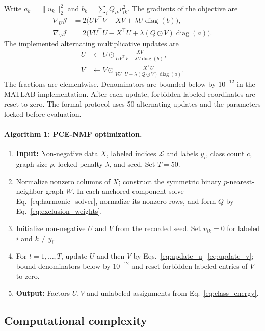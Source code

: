 \documentclass[preprint,12pt]{elsarticle}
\theoremstyle{remark}
\newcommand{\had}{\odot}
\begin{document}
Write $a_k=\|u_k\|_2^2$ and
$b_k=\sum_iQ_{ik}v_{ik}^2$. The gradients of the objective are
\begin{align}
\nabla_U\mathcal J
 &=2\bigl(UV^\top V-XV+\lambda U\operatorname{diag}(b)\bigr),
 \label{eq:grad_u}\\
\nabla_V\mathcal J
 &=2\bigl(VU^\top U-X^\top U
   +\lambda(Q\had V)\operatorname{diag}(a)\bigr).
 \label{eq:grad_v}
\end{align}
The implemented alternating multiplicative updates are
\begin{align}
U&\leftarrow U\had
 \frac{XV}{UV^\top V+\lambda U\operatorname{diag}(b)},
 \label{eq:update_u}\\
V&\leftarrow V\had
 \frac{X^\top U}{VU^\top U+\lambda(Q\had V)\operatorname{diag}(a)}.
 \label{eq:update_v}
\end{align}
The fractions are elementwise. Denominators are bounded below by
$10^{-12}$ in the MATLAB implementation. After each update, forbidden
labeled coordinates are reset to zero. The formal protocol uses 50
alternating updates and the parameters locked before evaluation.

\paragraph{Algorithm 1: PCE-NMF optimization.}
\begin{enumerate}[leftmargin=*,itemsep=2pt]
\item \textbf{Input:} Non-negative data $X$, labeled indices $\mathcal L$ and labels $y_i$, class count $c$, graph size $p$, locked penalty $\lambda$, and seed. Set $T=50$.
\item Normalize nonzero columns of $X$; construct the symmetric binary $p$-nearest-neighbor graph $W$. In each anchored component solve Eq.~\eqref{eq:harmonic_solver}, normalize its nonzero rows, and form $Q$ by Eq.~\eqref{eq:exclusion_weights}.
\item Initialize non-negative $U$ and $V$ from the recorded seed. Set $v_{ik}=0$ for labeled $i$ and $k\ne y_i$.
\item For $t=1,\ldots,T$, update $U$ and then $V$ by Eqs.~\eqref{eq:update_u}--\eqref{eq:update_v}; bound denominators below by $10^{-12}$ and reset forbidden labeled entries of $V$ to zero.
\item \textbf{Output:} Factors $U,V$ and unlabeled assignments from Eq.~\eqref{eq:class_energy}.
\end{enumerate}

\subsection{Computational complexity}
\end{document}
